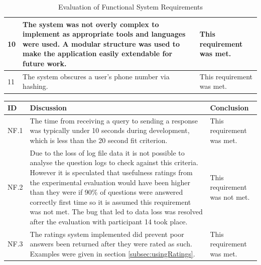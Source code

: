 \documentclass[authoryearcitations]{UoYCSproject}
\begin{document}
\begin{table}[h]
\begin{tabular}{|p{0.4cm}|p{9cm}|p{4.0cm}|}
10 & The system was not overly complex to implement as appropriate tools and languages were used. A modular structure was used to make the application easily extendable for future work. & This requirement was met. \\ \hline
11 & The system obscures a user's phone number via hashing.                                                                                                                               & This requirement was met. \\ \hline
\end{tabular}
\caption{Evaluation of Functional System Requirements}
\label{table:evalFunctionalReqs}
\end{table}

\begin{table}[h]
\begin{tabular}{|p{0.7cm}|p{9cm}|p{4.0cm}|}
\hline
ID   & Discussion                                                                                                                                                                                                                                                                                                                                     & Conclusion                    \\ \hline
NF.1 & The time from receiving a query to sending a response was typically under 10 seconds during development, which is less than the 20 second fit criterion.                                                                                                                                                                                       & This requirement was met.     \\ \hline
NF.2 & Due to the loss of log file data it is not possible to analyse the question logs to check against this criteria. However it is speculated that usefulness ratings from the experimental evaluation would have been higher than they were if 90\% of questions were answered correctly first time so it is assumed this requirement was not met. The bug that led to data loss was resolved after the evaluation with participant 14 took place. & This requirement was not met. \\ \hline
NF.3 & The ratings system implemented did prevent poor answers been returned after they were rated as such. Examples were given in section \ref{subsec:usingRatings}.                                                                                                                                                                                 & This requirement was met.     \\ \hline

\end{tabular}
\end{table}
\end{document}
